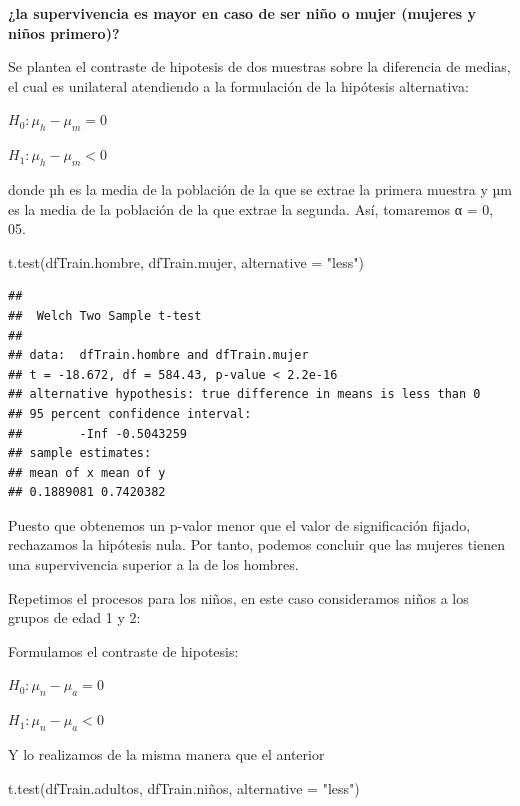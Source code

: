 \documentclass[
]{article}
\newenvironment{Shaded}{\begin{snugshade}}{\end{snugshade}}
\newcommand{\DataTypeTok}[1]{\textcolor[rgb]{0.87,0.87,0.75}{#1}}
\newcommand{\KeywordTok}[1]{\textcolor[rgb]{0.94,0.87,0.69}{#1}}
\newcommand{\NormalTok}[1]{\textcolor[rgb]{0.80,0.80,0.80}{#1}}
\newcommand{\StringTok}[1]{\textcolor[rgb]{0.80,0.58,0.58}{#1}}
\begin{document}
\textbf{¿la supervivencia es mayor en caso de ser niño o mujer (mujeres
y niños primero)?}

Se plantea el contraste de hipotesis de dos muestras sobre la diferencia
de medias, el cual es unilateral atendiendo a la formulación de la
hipótesis alternativa:

\(H_0: \mu_{h}-\mu_{m}=0\)

\(H_1: \mu_{h}-\mu_{m}<0\)

donde µh es la media de la población de la que se extrae la primera
muestra y µm es la media de la población de la que extrae la segunda.
Así, tomaremos α = 0, 05.

\begin{Shaded}
\begin{Highlighting}[]
\KeywordTok{t.test}\NormalTok{(dfTrain.hombre, dfTrain.mujer, }\DataTypeTok{alternative =} \StringTok{"less"}\NormalTok{)}
\end{Highlighting}
\end{Shaded}

\begin{verbatim}
## 
##  Welch Two Sample t-test
## 
## data:  dfTrain.hombre and dfTrain.mujer
## t = -18.672, df = 584.43, p-value < 2.2e-16
## alternative hypothesis: true difference in means is less than 0
## 95 percent confidence interval:
##        -Inf -0.5043259
## sample estimates:
## mean of x mean of y 
## 0.1889081 0.7420382
\end{verbatim}

Puesto que obtenemos un p-valor menor que el valor de significación
fijado, rechazamos la hipótesis nula. Por tanto, podemos concluir que
las mujeres tienen una supervivencia superior a la de los hombres.

Repetimos el procesos para los niños, en este caso consideramos niños a
los grupos de edad 1 y 2:

Formulamos el contraste de hipotesis:

\(H_0: \mu_{n}-\mu_{a}=0\)

\(H_1: \mu_{n}-\mu_{a}<0\)

Y lo realizamos de la misma manera que el anterior

\begin{Shaded}
\begin{Highlighting}[]
\KeywordTok{t.test}\NormalTok{(dfTrain.adultos, dfTrain.niños, }\DataTypeTok{alternative =} \StringTok{"less"}\NormalTok{)}
\end{Highlighting}
\end{Shaded}
\end{document}
